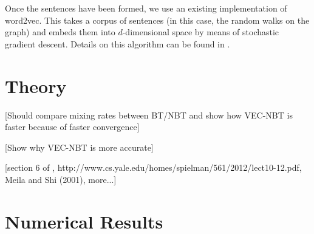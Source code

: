 \documentclass{article}
\begin{document}
Once the sentences have been formed, we use an existing implementation of
word2vec\cite{word2vec}. This takes a corpus of sentences (in this case, the
random walks on the graph) and embeds them into $d$-dimensional space by means
of stochastic gradient descent. Details on this algorithm can be found in
\cite{word2vec}.




\section{Theory}


[Should compare mixing rates between BT/NBT and show how VEC-NBT is faster
because of faster convergence]

[Show why VEC-NBT is more accurate] 


[section 6 of \cite{Luxburg},
http://www.cs.yale.edu/homes/spielman/561/2012/lect10-12.pdf, Meila and Shi
(2001), more...]





\section{Numerical Results}
\end{document}
